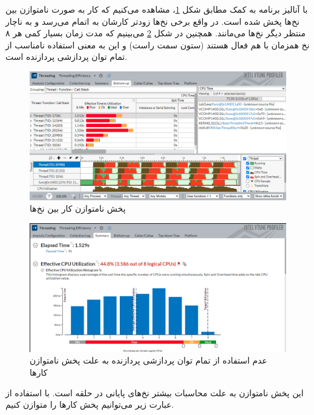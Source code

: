 \documentclass{HW}
\begin{document}
با آنالیز برنامه به کمک  مطابق شکل
\ref{fig:tune-bad}،
مشاهده می‌کنیم که کار به صورت نامتوازن بین نخ‌ها پخش شده است. در واقع برخی نخ‌ها زودتر کارشان به اتمام می‌رسد و به ناچار منتظر دیگر نخ‌ها می‌مانند. همچنین در شکل
\ref{fig:tune-bad2}
می‌بینیم که مدت زمان بسیار کمی هر ۸ نخ همزمان با هم فعال هستند (ستون سمت راست) و این به معنی استفاده نامناسب از تمام توان پردازشی پردازنده است.

\begin{figure}[ht!]
\begin{center}
	\includegraphics[width=15cm]{images/tune-bad}
\end{center}
\caption{پخش نامتوازن کار بین نخ‌ها}
\label{fig:tune-bad}
\end{figure}

\begin{figure}[ht!]
\begin{center}
	\includegraphics[width=15cm]{images/tune-bad2}
\end{center}
\caption{عدم استفاده از تمام توان پردازشی پردازنده به علت پخش نامتوازن کارها}
\label{fig:tune-bad2}
\end{figure}

این پخش نامتوازن به علت محاسبات بیشتر نخ‌های پایانی در حلقه  است. با استفاده از عبارت زیر می‌توانیم پخش کارها را متوازن کنیم.
\end{document}

